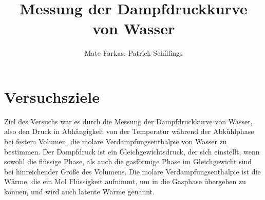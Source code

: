 \documentclass[]{article}
\title{Messung der Dampfdruckkurve von Wasser}
\date{}
\author{Mate Farkas, Patrick Schillings}
\begin{document}
\maketitle

\tableofcontents

\noindent\makebox[\linewidth]{\rule{\textwidth}{0.4pt}}

\section{Versuchsziele}
Ziel des Versuchs war es durch die Messung der Dampfdruckkurve von Wasser, also den Druck in Abhängigkeit von der Temperatur während der Abkühlphase bei festem Volumen, die molare Verdampfungsenthalpie von Wasser zu bestimmen. Der Dampfdruck ist ein Gleichgewichtsdruck, der sich einstellt, wenn sowohl die flüssige Phase, als auch die gasförmige Phase im Gleichgewicht sind bei hinreichender Größe des Volumens. Die molare Verdampfungsenthalpie ist die Wärme, die ein Mol Flüssigkeit aufnimmt, um in die Gasphase übergehen zu können, und wird auch latente Wärme genannt.
\end{document}
